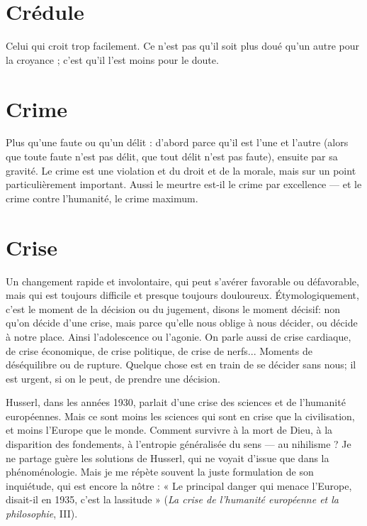 \section{Crédule}
Celui qui croit trop facilement. Ce n’est pas qu’il soit plus doué
qu’un autre pour la croyance ; c’est qu’il l’est moins pour le
doute.

\section{Crime}
Plus qu’une faute ou qu’un délit : d’abord parce qu’il est l’une et
l’autre (alors que toute faute n’est pas délit, que tout délit n’est pas
faute), ensuite par sa gravité. Le crime est une violation et du droit et de la
morale, mais sur un point particulièrement important. Aussi le meurtre est-il le
crime par excellence — et le crime contre l’humanité, le crime maximum.

\section{Crise}
Un changement rapide et involontaire, qui peut s’avérer favorable
ou défavorable, mais qui est toujours difficile et presque toujours
douloureux. Étymologiquement, c’est le moment de la décision ou du jugement,
disons le moment décisif: non qu’on décide d’une crise, mais parce
qu’elle nous oblige à nous décider, ou décide à notre place. Ainsi l'adolescence
ou l’agonie. On parle aussi de crise cardiaque, de crise économique, de crise
politique, de crise de nerfs... Moments de déséquilibre ou de rupture. Quelque
chose est en train de se décider sans nous; il est urgent, si on le peut, de
prendre une décision.

Husserl, dans les années 1930, parlait d’une crise des sciences et de l’humanité
européennes. Mais ce sont moins les sciences qui sont en crise que la civilisation,
et moins l’Europe que le monde. Comment survivre à la mort de
Dieu, à la disparition des fondements, à l’entropie généralisée du sens — au
nihilisme ? Je ne partage guère les solutions de Husserl, qui ne voyait d’issue
que dans la phénoménologie. Mais je me répète souvent la juste formulation de
son inquiétude, qui est encore la nôtre : « Le principal danger qui menace
l’Europe, disait-il en 1935, c’est la lassitude » ({\it }{\it La crise de l'humanité européenne
et la philosophie}, III).

